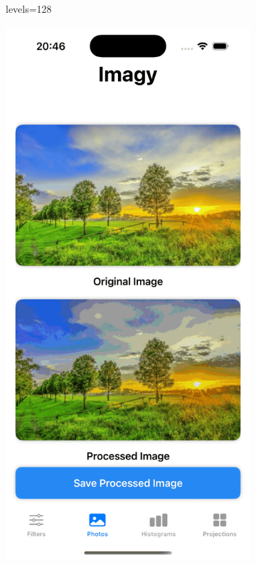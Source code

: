 \documentclass[a4paper]{article}
\begin{document}
\begin{figure}[H]
\begin{subfigure}{0.2\textwidth}
        \caption{levels=128}
        \label{fig:dog_posterize_128}
    \end{subfigure}
    \hfill
    \begin{subfigure}{0.2\textwidth}
        \centering
        \includegraphics[width=\linewidth]{images/trees_posterize_32.png}

\end{subfigure}
\end{figure}
\end{document}
